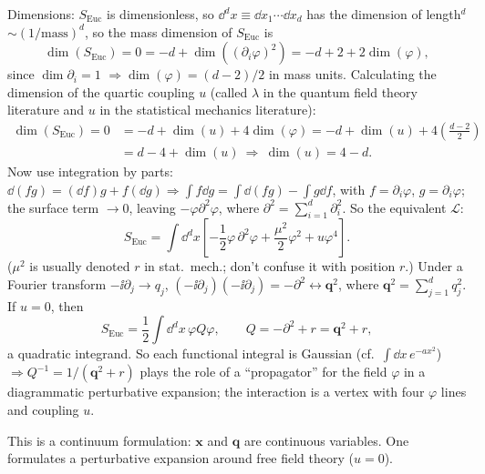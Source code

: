 Dimensions: $S_{\text{Euc}}$ is dimensionless, so $\dd^dx\equiv\dd x_1\cdots\dd x_d$ has the dimension of
length$^d$ $\sim(1/\text{mass})^d$, so the mass dimension of $S_{\text{Euc}}$ is
\begin{equation}
  \dim(S_{\text{Euc}}) = 0 = -d + \dim\left((\partial_i\varphi)^2\right) = -d + 2 + 2\dim(\varphi),
\end{equation}
since $\dim\partial_i = 1$ $\Rightarrow\dim(\varphi) = (d-2)/2$ in mass units. Calculating the
dimension of the quartic coupling $u$ (called $\lambda$ in the quantum field theory literature and $u$ in the
statistical mechanics literature):
\begin{align}
  \dim(S_{\text{Euc}}) = 0 &= -d + \dim(u) + 4\dim(\varphi) = -d + \dim(u) + 4\left(\frac{d-2}{2}\right)\nonumber\\
  &= d-4+\dim(u)\ \Rightarrow\ \dim(u) = 4-d .
\end{align}
Now use integration by parts: $\dd(fg) = (\dd f)g + f(\dd g)\Rightarrow\int f\dd g = \int\dd(fg) - \int g\dd f$,
with $f = \partial_i\varphi$, $g = \partial_i\varphi$; the surface term $\to 0$, leaving $-\varphi\partial^2\varphi$,
where $\partial^2 = \sum_{i=1}^d\partial_i^2$. So the equivalent $\mathcal L$:
\begin{equation}
  S_{\text{Euc}} = \int\dd^dx\left[-\frac{1}{2}\varphi\,\partial^2\varphi + \frac{\mu^2}{2}\varphi^2 + u\varphi^4\right].
\end{equation}
($\mu^2$ is usually denoted $r$ in stat.\ mech.; don't confuse it with position $r$.) Under a Fourier
transform $-\ii\partial_j\to q_j$, $(-\ii\partial_j)(-\ii\partial_j) = -\partial^2\leftrightarrow\mathbf q^2$, where
$\mathbf q^2 = \sum_{j=1}^dq_j^2$. If $u = 0$, then
\begin{equation}
  S_{\text{Euc}} = \frac{1}{2}\int\dd^dx\,\varphi Q\varphi,\qquad Q = -\partial^2 + r = \mathbf q^2 + r,
\end{equation}
a quadratic integrand. So each functional integral is Gaussian (cf.\ $\int\dd x\,e^{-ax^2}$)
$\Rightarrow Q^{-1} = 1/(\mathbf q^2+r)$ plays the role of a ``propagator'' for the field $\varphi$ in a
diagrammatic perturbative expansion; the interaction is a vertex with four $\varphi$ lines and coupling $u$.

This is a continuum formulation: $\mathbf x$ and $\mathbf q$ are continuous variables. One formulates a
perturbative expansion around free field theory ($u = 0$).

